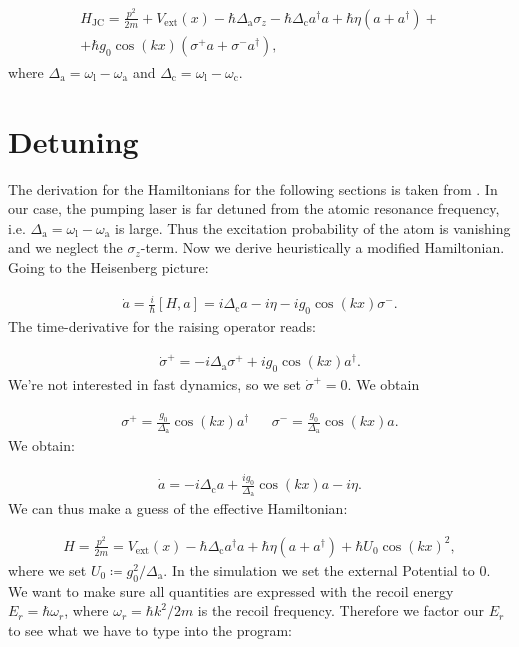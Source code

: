 \begin{align}
\begin{split}
H_\text{JC} = \frac{p^2}{2m} + V_\text{ext}(x) - \hbar \Delta_\text{a} \sigma_z - \hbar \Delta_\text{c} a^\dagger a + \hbar \eta (a + a^\dagger) + \\
+ \hbar g_0 \cos(kx) (\sigma^+ a + \sigma^- a^\dagger),
\end{split}
\end{align}where $\Delta_\text{a} = \omega_\text{l} - \omega_\text{a}$ and $\Delta_\text{c} = \omega_\text{l} - \omega_\text{c}$.

\section{Detuning}
The derivation for the Hamiltonians for the following sections is taken from \cite{donner}. In our case, the pumping laser is far detuned from the atomic resonance frequency, i.e. $\Delta_\text{a} = \omega_\text{l} - \omega_\text{a}$ is large. Thus the excitation probability of the atom is vanishing and we neglect the $\sigma_z$-term. Now we derive heuristically a modified Hamiltonian. Going to the Heisenberg picture:

\begin{align}
\dot{a} = \frac{i}{\hbar} [H, a] = i \Delta_\text{c} a - i \eta -i g_0 \cos(kx) \sigma^-.
\end{align}The time-derivative for the raising operator reads:

\begin{align}
\dot{\sigma}^+ = -i \Delta_\text{a} \sigma^+ + i g_0 \cos(kx) a^\dagger.
\end{align}We're not interested in fast dynamics, so we set $\dot{\sigma}^+ = 0$. We obtain

\begin{align}
\sigma^+ = \frac{g_0 }{\Delta_\text{a}} \cos(kx) a^\dagger && \sigma^- = \frac{g_0 }{\Delta_\text{a}} \cos(kx) a.
\end{align}We obtain:

\begin{align}
\dot{a} = -i \Delta_\text{c} a + \frac{i g_0}{\Delta_\text{a}}  \cos(kx) a - i \eta.
\end{align}We can thus make a guess of the effective Hamiltonian:

\begin{align}
H = \frac{p^2}{2m} = V_\text{ext}(x) - \hbar \Delta_\text{c} a^\dagger a + \hbar \eta (a + a^\dagger) + \hbar U_0 \cos(kx)^2,
\end{align}where we set $U_0 \coloneqq g_0^2 / \Delta_\text{a}$. In the simulation we set the external Potential to 0. We want to make sure all quantities are expressed with the recoil energy $E_r = \hbar \omega_r$, where $\omega_r = \hbar k^2 / 2m$ is the recoil frequency. Therefore we factor our $E_r$ to see what we have to type into the program:

